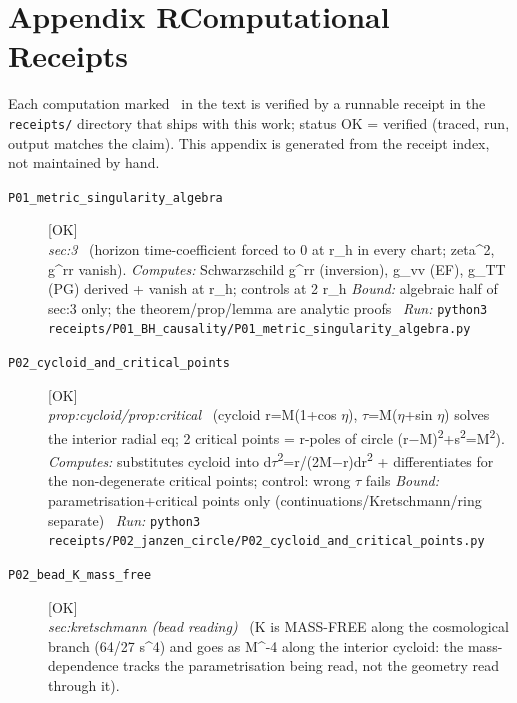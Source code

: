 \clearpage
\section*{Appendix R\quad Computational Receipts}\label{app:receipts}
\small\noindent Each computation marked \rcptmarker\ in the text is verified by a runnable receipt in the \texttt{receipts/} directory that ships with this work; status \textsf{OK} = verified (traced, run, output matches the claim). This appendix is generated from the receipt index, not maintained by hand.\par\medskip
\begingroup\renewcommand{\arraystretch}{1.25}
\begin{description}
\item[\label{rcpt:P01_metric_singularity_algebra}\texttt{P01\_metric\_singularity\_algebra}]\hfill\textsf{[OK]}\\
\textit{sec:3} \ (horizon time-coefficient forced to 0 at r\_h in every chart; \textbar{}zeta\textbar{}\textasciicircum{}2, g\textasciicircum{}rr vanish). 
\emph{Computes:} Schwarzschild g\textasciicircum{}rr (inversion), g\_vv (EF), g\_TT (PG) derived + vanish at r\_h; controls at 2 r\_h
 \emph{Bound:} algebraic half of sec:3 only; the theorem/prop/lemma are analytic proofs
\ \emph{Run:} \texttt{python3 receipts/P01\_BH\_causality/P01\_metric\_singularity\_algebra.py}
\item[\label{rcpt:P02_cycloid_and_critical_points}\texttt{P02\_cycloid\_and\_critical\_points}]\hfill\textsf{[OK]}\\
\textit{prop:cycloid/prop:critical} \ (cycloid r=M(1+cos \ensuremath{\eta}), \ensuremath{\tau}=M(\ensuremath{\eta}+sin \ensuremath{\eta}) solves the interior radial eq; 2 critical points = r-poles of circle (r\ensuremath{-}M)\textsuperscript{2}+s\textsuperscript{2}=M\textsuperscript{2}). 
\emph{Computes:} substitutes cycloid into d\ensuremath{\tau}\textsuperscript{2}=r/(2M\ensuremath{-}r)dr\textsuperscript{2} + differentiates for the non-degenerate critical points; control: wrong \ensuremath{\tau} fails
 \emph{Bound:} parametrisation+critical points only (continuations/Kretschmann/ring separate)
\ \emph{Run:} \texttt{python3 receipts/P02\_janzen\_circle/P02\_cycloid\_and\_critical\_points.py}
\item[\label{rcpt:P02_bead_K_mass_free}\texttt{P02\_bead\_K\_mass\_free}]\hfill\textsf{[OK]}\\
\textit{sec:kretschmann (bead reading)} \ (K is MASS-FREE along the cosmological branch (64/27 s\textasciicircum{}4) and goes as M\textasciicircum{}-4 along the interior cycloid: the mass-dependence tracks the parametrisation being read, not the geometry read through it). 

\end{description}
